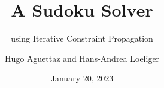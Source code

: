 \documentclass{beamer}
\title{A Sudoku Solver}
\subtitle{using Iterative Constraint Propagation}
\author{Hugo Aguettaz and Hans-Andrea Loeliger}
\institute{Institut für Signal- und Informationsverarbeitung\\ETH Zürich}
\date{January 20, 2023}
\begin{document}
	\begin{frame}
		\titlepage
	\end{frame} 
\end{document}
